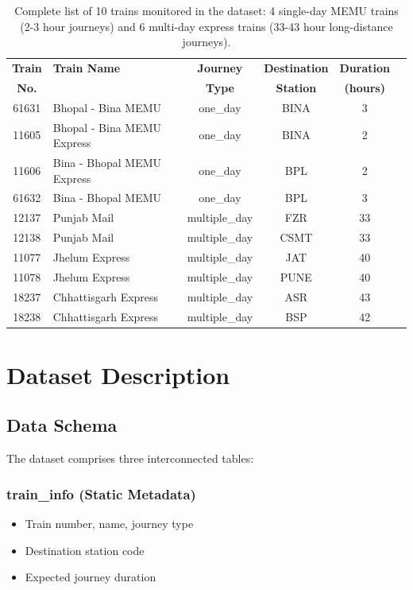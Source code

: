 \documentclass[11pt,a4paper]{article}
\begin{document}
\begin{table}[h]
\centering
\small
\begin{tabular}{@{}clcccc@{}}
\toprule
\textbf{Train} & \textbf{Train Name} & \textbf{Journey} & \textbf{Destination} & \textbf{Duration} \\
\textbf{No.} & & \textbf{Type} & \textbf{Station} & \textbf{(hours)} \\
\midrule
61631 & Bhopal - Bina MEMU & one\_day & BINA & 3 \\
11605 & Bhopal - Bina MEMU Express & one\_day & BINA & 2 \\
11606 & Bina - Bhopal MEMU Express & one\_day & BPL & 2 \\
61632 & Bina - Bhopal MEMU & one\_day & BPL & 3 \\
12137 & Punjab Mail & multiple\_day & FZR & 33 \\
12138 & Punjab Mail & multiple\_day & CSMT & 33 \\
11077 & Jhelum Express  & multiple\_day & JAT & 40 \\
11078 & Jhelum Express & multiple\_day & PUNE & 40 \\
18237 & Chhattisgarh Express & multiple\_day & ASR & 43 \\
18238 & Chhattisgarh Express & multiple\_day & BSP & 42 \\
\bottomrule
\end{tabular}
\caption{Complete list of 10 trains monitored in the dataset: 4 single-day MEMU trains (2-3 hour journeys) and 6 multi-day express trains (33-43 hour long-distance journeys).}
\label{tab:train_info}
\end{table}

\section{Dataset Description}

\subsection{Data Schema}

The dataset comprises three interconnected tables:

\subsubsection{train\_info (Static Metadata)}
\begin{itemize}
    \item Train number, name, journey type
    \item Destination station code
    \item Expected journey duration
\end{itemize}
\end{document}
